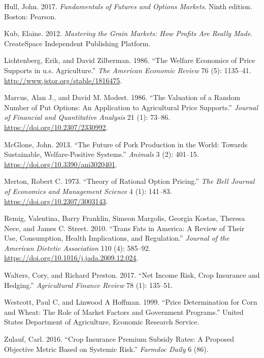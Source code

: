 \documentclass[
  letterpaper,
  DIV=11,
  numbers=noendperiod]{scrreprt}
\newlength{\cslhangindent}
\newlength{\cslentryspacingunit} %
\newenvironment{CSLReferences}[2] %
 {%
  \setlength{\parindent}{0pt}
  \ifodd #1
  \let\oldpar\par
  \def\par{\hangindent=\cslhangindent\oldpar}
  \fi
  \setlength{\parskip}{#2\cslentryspacingunit}
 }%
 {}
\begin{document}
\begin{CSLReferences}{1}{0}
\leavevmode{}%
Hull, John. 2017. \emph{Fundamentals of Futures and Options Markets}.
Ninth edition. Boston: Pearson.

\leavevmode{}%
Kub, Elaine. 2012. \emph{Mastering the Grain Markets: How Profits Are
Really Made}. {CreateSpace} Independent Publishing Platform.

\leavevmode{}%
Lichtenberg, Erik, and David Zilberman. 1986. {``The Welfare Economics
of Price Supports in u.s. Agriculture.''} \emph{The American Economic
Review} 76 (5): 1135--41. \url{http://www.jstor.org/stable/1816475}.

\leavevmode{}%
Marcus, Alan J., and David M. Modest. 1986. {``The Valuation of a Random
Number of Put Options: An Application to Agricultural Price Supports.''}
\emph{Journal of Financial and Quantitative Analysis} 21 (1): 73--86.
\url{https://doi.org/10.2307/2330992}.

\leavevmode{}%
McGlone, John. 2013. {``The Future of Pork Production in the World:
Towards Sustainable, Welfare-Positive Systems.''} \emph{Animals} 3 (2):
401--15. \url{https://doi.org/10.3390/ani3020401}.

\leavevmode{}%
Merton, Robert C. 1973. {``Theory of Rational Option Pricing.''}
\emph{The Bell Journal of Economics and Management Science} 4 (1):
141--83. \url{https://doi.org/10.2307/3003143}.

\leavevmode{}%
Remig, Valentina, Barry Franklin, Simeon Margolis, Georgia Kostas,
Theresa Nece, and James C. Street. 2010. {``Trans Fats in America: A
Review of Their Use, Consumption, Health Implications, and
Regulation.''} \emph{Journal of the American Dietetic Association} 110
(4): 585--92. \url{https://doi.org/10.1016/j.jada.2009.12.024}.

\leavevmode{}%
Walters, Cory, and Richard Preston. 2017. {``Net Income Risk, Crop
Insurance and Hedging.''} \emph{Agricultural Finance Review} 78 (1):
135--51.

\leavevmode{}%
Westcott, Paul C, and Linwood A Hoffman. 1999. {``Price Determination
for Corn and Wheat: The Role of Market Factors and Government
Programs.''} United States Department of Agriculture, Economic Research
Service.

\leavevmode{}%
Zulauf, Carl. 2016. {``Crop Insurance Premium Subsidy Rates: A Proposed
Objective Metric Based on Systemic Risk.''} \emph{Farmdoc Daily} 6 (86).

\end{CSLReferences}
\end{document}
